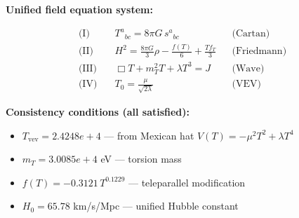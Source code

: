 
\textbf{Unified field equation system:}

\begin{align}
  \text{(I)} \quad & T^a{}_{bc} = 8\pi G \, s^a{}_{bc} && \text{(Cartan)} \\
  \text{(II)} \quad & H^2 = \frac{8\pi G}{3}\rho - \frac{f(T)}{6} + \frac{Tf_T}{3} && \text{(Friedmann)} \\
  \text{(III)} \quad & \Box T + m_T^2 T + \lambda T^3 = J && \text{(Wave)} \\
  \text{(IV)} \quad & T_0 = \frac{\mu}{\sqrt{2\lambda}} && \text{(VEV)}
\end{align}

\textbf{Consistency conditions (all satisfied):}
\begin{itemize}
  \item $T_{\text{vev}} = 2.4248e+4$ — from Mexican hat $V(T) = -\mu^2 T^2 + \lambda T^4$
  \item $m_T = 3.0085e+4$ eV — torsion mass
  \item $f(T) = -0.3121 \, T^{0.1229}$ — teleparallel modification
  \item $H_0 = 65.78$ km/s/Mpc — unified Hubble constant
\end{itemize}